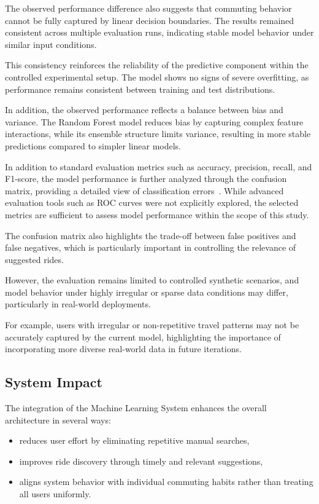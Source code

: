 The observed performance difference also suggests that commuting behavior cannot be fully captured by linear decision boundaries. The results remained consistent across multiple evaluation runs, indicating stable model behavior under similar input conditions.

This consistency reinforces the reliability of the predictive component within the controlled experimental setup. The model shows no signs of severe overfitting, as performance remains consistent between training and test distributions.

In addition, the observed performance reflects a balance between bias and variance. The Random Forest model reduces bias by capturing complex feature interactions, while its ensemble structure limits variance, resulting in more stable predictions compared to simpler linear models.

In addition to standard evaluation metrics such as accuracy, precision, recall, and F1-score, the model performance is further analyzed through the confusion matrix, providing a detailed view of classification errors~\cite{classification}. While advanced evaluation tools such as ROC curves were not explicitly explored, the selected metrics are sufficient to assess model performance within the scope of this study.

The confusion matrix also highlights the trade-off between false positives and false negatives, which is particularly important in controlling the relevance of suggested rides.

However, the evaluation remains limited to controlled synthetic scenarios, and model behavior under highly irregular or sparse data conditions may differ, particularly in real-world deployments.

For example, users with irregular or non-repetitive travel patterns may not be accurately captured by the current model, highlighting the importance of incorporating more diverse real-world data in future iterations.

\subsection{System Impact}

The integration of the Machine Learning System enhances the overall architecture in several ways:

\begin{itemize}
    \item reduces user effort by eliminating repetitive manual searches,
    \item improves ride discovery through timely and relevant suggestions,
    \item aligns system behavior with individual commuting habits rather than treating all users uniformly.
\end{itemize}

